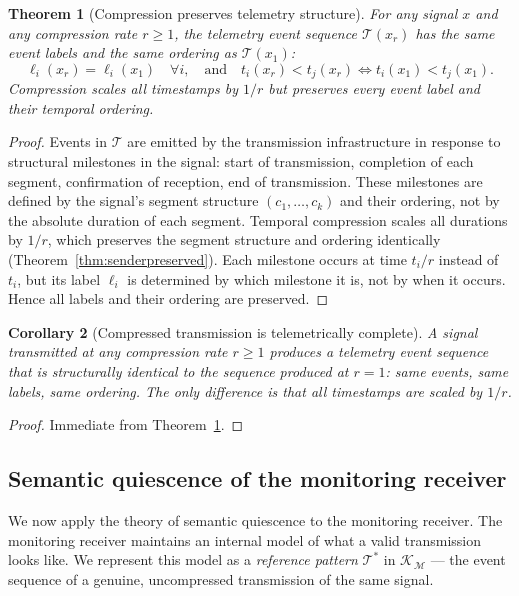 \documentclass[twocolumn,11pt,a4paper]{article}
\theoremstyle{main}
\newtheorem{theorem}{Theorem}[section]
\newtheorem{corollary}[theorem]{Corollary}
\theoremstyle{definition}
\theoremstyle{remark}
\newcommand{\Know}{\mathcal{K}}
\newcommand{\rate}{r}
\newcommand{\Mon}{\mathcal{M}}        %
\newcommand{\Tel}{\mathcal{T}}        %
\begin{document}
\begin{theorem}[Compression preserves telemetry structure]
\label{thm:telemetry}
For any signal $x$ and any compression rate $\rate \geq 1$, the
telemetry event sequence $\Tel(x_\rate)$ has the same event labels
and the same ordering as $\Tel(x_1)$:
\[
  \ell_i(x_\rate) = \ell_i(x_1) \quad \forall i,
  \quad \text{and} \quad
  t_i(x_\rate) < t_j(x_\rate) \iff t_i(x_1) < t_j(x_1).
\]
Compression scales all timestamps by $1/\rate$ but preserves every
event label and their temporal ordering.
\end{theorem}

\begin{proof}
Events in $\Tel$ are emitted by the transmission infrastructure in
response to structural milestones in the signal: start of transmission,
completion of each segment, confirmation of reception, end of
transmission. These milestones are defined by the signal's segment
structure $(c_1, \ldots, c_k)$ and their ordering, not by the absolute
duration of each segment. Temporal compression scales all durations by
$1/\rate$, which preserves the segment structure and ordering
identically (Theorem~\ref{thm:senderpreserved}). Each milestone occurs
at time $t_i / \rate$ instead of $t_i$, but its label $\ell_i$ is
determined by which milestone it is, not by when it occurs. Hence all
labels and their ordering are preserved.
\end{proof}

\begin{corollary}[Compressed transmission is telemetrically complete]
\label{cor:telcomplete}
A signal transmitted at any compression rate $\rate \geq 1$ produces a
telemetry event sequence that is structurally identical to the sequence
produced at $\rate = 1$: same events, same labels, same ordering. The
only difference is that all timestamps are scaled by $1/\rate$.
\end{corollary}

\begin{proof}
Immediate from Theorem~\ref{thm:telemetry}.
\end{proof}

\subsection{Semantic quiescence of the monitoring receiver}

We now apply the theory of semantic quiescence to the monitoring
receiver. The monitoring receiver maintains an internal model of what
a valid transmission looks like. We represent this model as a
\emph{reference pattern} $\Tel^*$ in $\Know_\Mon$ --- the event
sequence of a genuine, uncompressed transmission of the same signal.
\end{document}
